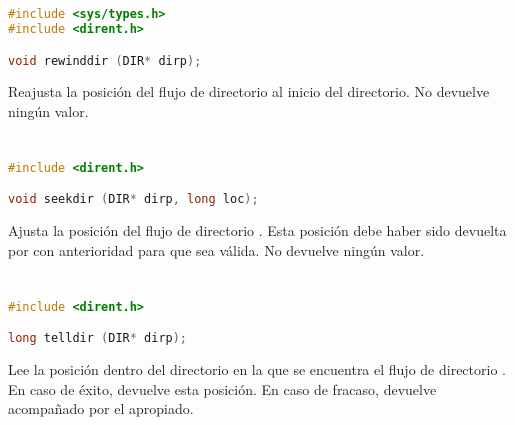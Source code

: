 \section{}\label{rewinddir}

\begin{lstlisting}[language=C]
#include <sys/types.h>
#include <dirent.h>

void rewinddir (DIR* dirp);
\end{lstlisting}

Reajusta la posición del flujo de directorio  al inicio del directorio.
No devuelve ningún valor.

\section{}\label{seekdir}

\begin{lstlisting}[language=C]
#include <dirent.h>

void seekdir (DIR* dirp, long loc);
\end{lstlisting}

Ajusta la posición del flujo de directorio .
Esta posición debe haber sido devuelta por  con anterioridad para que sea válida.
No devuelve ningún valor.

\section{}\label{telldir}

\begin{lstlisting}[language=C]
#include <dirent.h>

long telldir (DIR* dirp);
\end{lstlisting}

Lee la posición dentro del directorio en la que se encuentra el flujo de directorio .
En caso de éxito, devuelve esta posición.
En caso de fracaso, devuelve  acompañado por el  apropiado.

